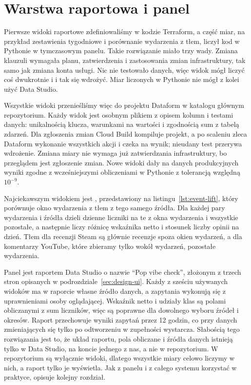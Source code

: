 \section{Warstwa raportowa i panel}
\label{sec:impl-reporting}

Pierwsze widoki raportowe zdefiniowaliśmy w kodzie Terraform, a część miar, na przykład zestawienia tygodniowe i porównanie wydarzenia z tłem, liczył kod w Pythonie w tymczasowym panelu.
Takie rozwiązanie miało trzy wady.
Zmiana klauzuli  wymagała planu, zatwierdzenia i zastosowania zmian infrastruktury, tak samo jak zmiana konta usługi.
Nic nie testowało danych, więc widok mógł liczyć coś dwukrotnie i i tak się wdrożyć.
Miar liczonych w Pythonie nie mógł z kolei użyć Data Studio.

Wszystkie widoki przenieśliśmy więc do projektu Dataform w katalogu głównym repozytorium.
Każdy widok jest osobnym plikiem z opisem kolumn i testami danych: unikalnością klucza, warunkami na wartości i zgodnością sum z tabelą zdarzeń.
Dla zgłoszenia zmian Cloud Build kompiluje projekt, a po scaleniu zleca Dataform wykonanie wszystkich akcji i czeka na wynik; nieudany test przerywa wdrożenie.
Zmiana miary nie wymaga już zatwierdzania infrastruktury, bo przeglądem jest zgłoszenie zmian.
Nowe widoki dały na danych produkcyjnych wyniki zgodne z wcześniejszymi obliczeniami w Pythonie z tolerancją względną $10^{-9}$.

Najciekawszym widokiem jest , przedstawiony na listingu~\ref{lst:event-lift}, który porównuje okno wydarzenia z tłem z tego samego źródła.
Dla każdej pary wydarzenia i źródła dzieli dzienne liczniki na te z okna wydarzenia i wszystkie pozostałe, a następnie liczy różnicę wskaźnika netto i stosunek liczby opinii na dzień.
Tłem dla recenzji Steam są głównie recenzje spoza okien wydarzeń, a dla komentarzy YouTube, które zbieramy tylko wokół wydarzeń, pozostałe wydarzenia.



Panel jest raportem Data Studio o nazwie \enquote{Pop vibe check}, złożonym z trzech stron opisanych w podrozdziale~\ref{sec:design-ui}.
Każdy z sześciu używanych widoków ma w raporcie własne źródło danych, a zapytania wykonują się z uprawnieniami osoby oglądającej.
Wskaźnik netto i udziały klas są polami obliczanymi z sum liczników, więc są poprawne dla dowolnego wyboru źródeł i okresów.
Raport przechowuje wyniki zapytań przez 12 godzin, co przy danych zmieniających się tylko po odtworzeniu w zupełności wystarcza.
Słabością tego rozwiązania jest to, że układ raportu, pola obliczane i źródła danych istnieją tylko w Data Studio, na koncie jednego z nas, a nie w repozytorium.
W repozytorium są wyłącznie widoki, dlatego wszystkie miary celowo liczymy w nich, a raport tylko je wyświetla.
Jak z panelu i z całego systemu korzystać w praktyce, opisuje kolejny rozdział.

